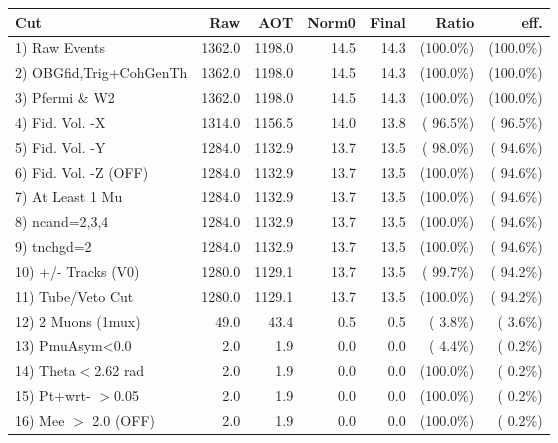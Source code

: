  \begin{table}[h!]\centering
 \begin{tabular}{||l||r|r|r|r|r|r||}
 \hline
 \hline
 Cut & Raw & AOT & Norm0 & Final & Ratio & eff.       \\
 \hline
  1) Raw Events           &       1362.0 &       1198.0 &         14.5 &         14.3 & (100.0\%) & (100.0\%) \\
  2) OBGfid,Trig+CohGenTh &       1362.0 &       1198.0 &         14.5 &         14.3 & (100.0\%) & (100.0\%) \\
  3) Pfermi \& W2         &       1362.0 &       1198.0 &         14.5 &         14.3 & (100.0\%) & (100.0\%) \\
  4) Fid. Vol. -X         &       1314.0 &       1156.5 &         14.0 &         13.8 & ( 96.5\%) & ( 96.5\%) \\
  5) Fid. Vol. -Y         &       1284.0 &       1132.9 &         13.7 &         13.5 & ( 98.0\%) & ( 94.6\%) \\
  6) Fid. Vol. -Z (OFF)   &       1284.0 &       1132.9 &         13.7 &         13.5 & (100.0\%) & ( 94.6\%) \\
  7) At Least 1 Mu        &       1284.0 &       1132.9 &         13.7 &         13.5 & (100.0\%) & ( 94.6\%) \\
  8) ncand=2,3,4          &       1284.0 &       1132.9 &         13.7 &         13.5 & (100.0\%) & ( 94.6\%) \\
  9) tnchgd=2             &       1284.0 &       1132.9 &         13.7 &         13.5 & (100.0\%) & ( 94.6\%) \\
 10) +/- Tracks (V0)      &       1280.0 &       1129.1 &         13.7 &         13.5 & ( 99.7\%) & ( 94.2\%) \\
 11) Tube/Veto Cut        &       1280.0 &       1129.1 &         13.7 &         13.5 & (100.0\%) & ( 94.2\%) \\
 12) 2 Muons (1mux)       &         49.0 &         43.4 &          0.5 &          0.5 & (  3.8\%) & (  3.6\%) \\
 13) PmuAsym<0.0          &          2.0 &          1.9 &          0.0 &          0.0 & (  4.4\%) & (  0.2\%) \\
 14) Theta$<$2.62 rad     &          2.0 &          1.9 &          0.0 &          0.0 & (100.0\%) & (  0.2\%) \\
 15) Pt+wrt- $>$0.05      &          2.0 &          1.9 &          0.0 &          0.0 & (100.0\%) & (  0.2\%) \\
 16) Mee $>$ 2.0  (OFF)   &          2.0 &          1.9 &          0.0 &          0.0 & (100.0\%) & (  0.2\%) \\

\end{tabular}
\end{table}
